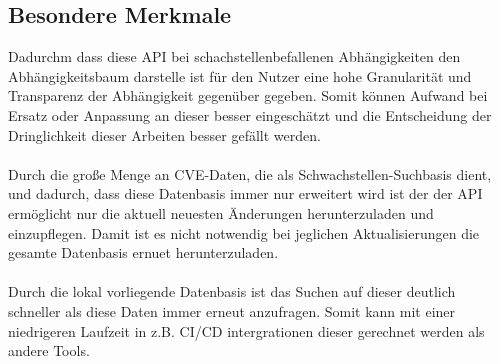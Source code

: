 \subsection{Besondere Merkmale} \label{sec:Besondere Merkmale}
Dadurchm dass diese API bei schachstellenbefallenen Abhängigkeiten den Abhängigkeitsbaum darstelle ist für den Nutzer eine hohe Granularität und Transparenz der Abhängigkeit gegenüber gegeben.
Somit können Aufwand bei Ersatz oder Anpassung an dieser besser eingeschätzt und die Entscheidung der Dringlichkeit dieser Arbeiten besser gefällt werden.
\\ \\
Durch die große Menge an CVE-Daten, die als Schwachstellen-Suchbasis dient, und dadurch, dass diese Datenbasis immer nur erweitert wird ist der der API ermöglicht nur die aktuell neuesten Änderungen herunterzuladen und einzupflegen.
Damit ist es nicht notwendig bei jeglichen Aktualisierungen die gesamte Datenbasis ernuet herunterzuladen.
\\ \\
Durch die lokal vorliegende Datenbasis ist das Suchen auf dieser deutlich schneller als diese Daten immer erneut anzufragen.
Somit kann mit einer niedrigeren Laufzeit in z.B. CI/CD intergrationen dieser gerechnet werden als andere Tools.